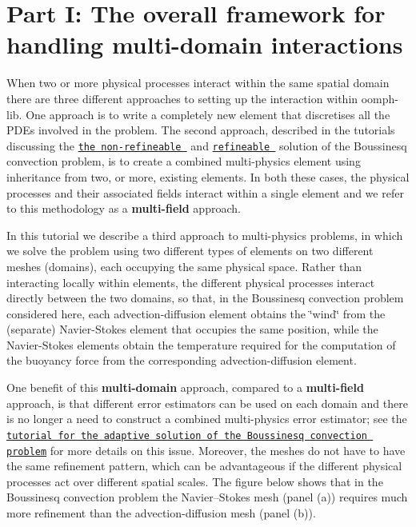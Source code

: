 \hypertarget{index_setting_up}{}\section{Part I\+: The overall framework for handling multi-\/domain interactions}\label{index_setting_up}
When two or more physical processes interact within the same spatial domain there are three different approaches to setting up the interaction within {\ttfamily oomph-\/lib}. One approach is to write a completely new element that discretises all the P\+D\+Es involved in the problem. The second approach, described in the tutorials discussing the \href{../../b_convection/html/index.html}{\tt the non-\/refineable } and \href{../../refine_b_convect/html/index.html}{\tt refineable } solution of the Boussinesq convection problem, is to create a combined multi-\/physics element using inheritance from two, or more, existing elements. In both these cases, the physical processes and their associated fields interact within a single element and we refer to this methodology as a {\bfseries multi-\/field} approach.

In this tutorial we describe a third approach to multi-\/physics problems, in which we solve the problem using two different types of elements on two different meshes (domains), each occupying the same physical space. Rather than interacting locally within elements, the different physical processes interact directly between the two domains, so that, in the Boussinesq convection problem considered here, each advection-\/diffusion element obtains the \char`\"{}wind\char`\"{} from the (separate) Navier-\/\+Stokes element that occupies the same position, while the Navier-\/\+Stokes elements obtain the temperature required for the computation of the buoyancy force from the corresponding advection-\/diffusion element.

One benefit of this {\bfseries multi-\/domain} approach, compared to a {\bfseries multi-\/field} approach, is that different error estimators can be used on each domain and there is no longer a need to construct a combined multi-\/physics error estimator; see the \href{../../refine_b_convect/html/index.html}{\tt tutorial for the adaptive solution of the Boussinesq convection problem} for more details on this issue. Moreover, the meshes do not have to have the same refinement pattern, which can be advantageous if the different physical processes act over different spatial scales. The figure below shows that in the Boussinesq convection problem the Navier--Stokes mesh (panel (a)) requires much more refinement than the advection-\/diffusion mesh (panel (b)).

